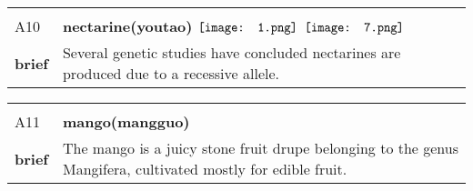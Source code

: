 \documentclass[UTF8]{article}
\begin{document}
            \begin{tabularx}{\textwidth}{p{1.5cm}X}
            \arrayrulecolor{myBlue}
        	\hline\\
            \small{A10}&
            \large{\bfseries{nectarine(youtao)}}\hfill
                                                            $\vcenter{\hbox{\texttt{[image: 1.png]}}}$
                                                                \phantom{$\vcenter{\hbox{\texttt{[image: 2.png]}}}$}
                                                                \phantom{$\vcenter{\hbox{\texttt{[image: 3.png]}}}$}
                                                                \phantom{$\vcenter{\hbox{\texttt{[image: 4.png]}}}$}
                                                                \phantom{$\vcenter{\hbox{\texttt{[image: 5.png]}}}$}
                                                                \phantom{$\vcenter{\hbox{\texttt{[image: 6.png]}}}$}
                                                                $\vcenter{\hbox{\texttt{[image: 7.png]}}}$
                                        \\[10pt]
            \large{\bfseries{brief}}&\noindent\parbox[c]{\hsize}{Several genetic studies have concluded nectarines are produced due to a recessive allele.} \\[5pt]
            \hline\\[-10pt]
        \end{tabularx}
            \begin{tabularx}{\textwidth}{p{1.5cm}X}
            \arrayrulecolor{myBlue}
        	\hline\\
            \small{A11}&
            \large{\bfseries{mango(mangguo)}}\hfill
                                                            \phantom{$\vcenter{\hbox{\texttt{[image: 1.png]}}}$}
                                                                \phantom{$\vcenter{\hbox{\texttt{[image: 2.png]}}}$}
                                                                \phantom{$\vcenter{\hbox{\texttt{[image: 3.png]}}}$}
                                                                \phantom{$\vcenter{\hbox{\texttt{[image: 4.png]}}}$}
                                                                \phantom{$\vcenter{\hbox{\texttt{[image: 5.png]}}}$}
                                                                \phantom{$\vcenter{\hbox{\texttt{[image: 6.png]}}}$}
                                                                \phantom{$\vcenter{\hbox{\texttt{[image: 7.png]}}}$}
                                        \\[10pt]
            \large{\bfseries{brief}}&\noindent\parbox[c]{\hsize}{The mango is a juicy stone fruit drupe belonging to the genus Mangifera, cultivated mostly for edible fruit. } \\[5pt]
            \hline\\[-10pt]
        \end{tabularx}
\end{document}
